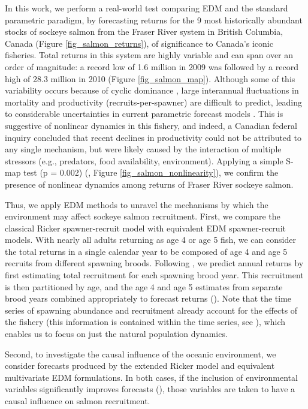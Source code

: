 In this work, we perform a real-world test comparing EDM and the standard parametric paradigm, by forecasting returns for the 9 most historically abundant stocks of sockeye salmon from the Fraser River system in British Columbia, Canada (Figure \ref{fig_salmon_returns}), of significance to Canada's iconic fisheries. Total returns in this system are highly variable and can span over an order of magnitude: a record low of 1.6 million in 2009 was followed by a record high of 28.3 million in 2010 (Figure \ref{fig_salmon_map}). Although some of this variability occurs because of cyclic dominance \cite{Ricker_1950, Cass_1994}, large interannual fluctuations in mortality and productivity (recruits-per-spawner) are difficult to predict, leading to considerable uncertainties in current parametric forecast models \cite{Grant_2011}. This is suggestive of nonlinear dynamics in this fishery, and indeed, a Canadian federal inquiry \cite{Cohen_2012, Thomson_2012} concluded that recent declines in productivity could not be attributed to any single mechanism, but were likely caused by the interaction of multiple stressors (e.g., predators, food availability, environment). Applying a simple S-map test (p = 0.002) (, Figure \ref{fig_salmon_nonlinearity}), we confirm the presence of nonlinear dynamics among returns of Fraser River sockeye salmon.

Thus, we apply EDM methods to unravel the mechanisms by which the environment may affect sockeye salmon recruitment. First, we compare the classical Ricker spawner-recruit model with equivalent EDM spawner-recruit models. With nearly all adults returning as age 4 or age 5 fish, we can consider the total returns in a single calendar year to be composed of age 4 and age 5 recruits from different spawning broods. Following \cite{Grant_2010}, we predict annual returns by first estimating total recruitment for each spawning brood year. This recruitment is then partitioned by age, and the age 4 and age 5 estimates from separate brood years combined appropriately to forecast returns (). Note that the time series of spawning abundance and recruitment already account for the effects of the fishery (this information is contained within the time series, see ), which enables us to focus on just the natural population dynamics.

Second, to investigate the causal influence of the oceanic environment, we consider forecasts produced by the extended Ricker model and equivalent multivariate EDM formulations. In both cases, if the inclusion of environmental variables significantly improves forecasts (), those variables are taken to have a causal influence on salmon recruitment.

